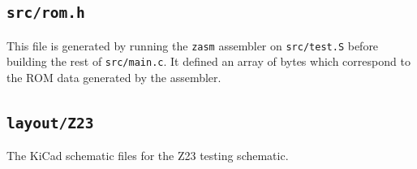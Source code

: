 \documentclass[10pt]{article}
\begin{document}
\subsection{\texttt{src/rom.h}}
This file is generated by running the \verb|zasm| assembler on \verb|src/test.S| before building the
rest of \verb|src/main.c|. It defined an array of bytes which correspond to the ROM data generated
by the assembler.

\subsection{\texttt{layout/Z23}}
The KiCad schematic files for the Z23 testing schematic.
\end{document}
